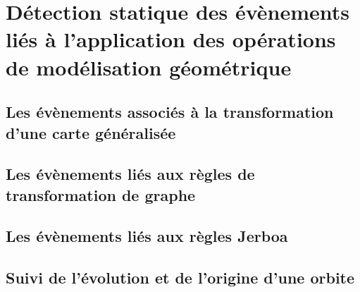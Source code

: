 
\chapter[Détection statique des évènements liés à l'application des opérations de modélisation géométrique]{Détection statique des évènements liés à l'application des opérations de modélisation géométrique}
\label{cha:detection-statique-evenements}

\section[Les évènements associés à la transformation d'une carte généralisée]{Les évènements associés à la transformation d'une carte généralisée}
\label{sec:evenements-g-carte}

\section[Les évènements liés aux règles de transformation de graphe]{Les évènements liés aux règles de transformation de graphe}
\label{sec:evenements-regles-transformation-graphe}

\section[Les évènements liés aux règles Jerboa]{Les évènements liés aux règles Jerboa}
\label{sec:evenements-regles-jerboa}

\section[Suivi de l'évolution et de l'origine d'une orbite]{Suivi de l'évolution et de l'origine d'une orbite}
\label{sec:suivi-origine-orbite}


